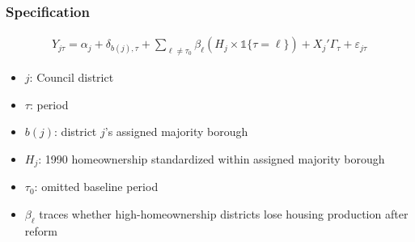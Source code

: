 \begin{frame}
    \frametitle{Specification}

    \begin{align*}
        Y_{j\tau}
        =
        \alpha_j
        +
        \delta_{b(j),\tau}
        +
        \sum_{\ell \neq \tau_0}
        \beta_\ell
        \left(H_j \times \mathds{1}\{\tau=\ell\}\right)
        +
        X_j'\Gamma_\tau
        +
        \varepsilon_{j\tau}
    \end{align*}

    \vspace{0.5em}
    \begin{itemize}
        \item \(j\): Council district
        \item \(\tau\): period
        \item \(b(j)\): district \(j\)'s assigned majority borough
        \item \(H_j\): 1990 homeownership standardized within assigned majority borough
        \item \(\tau_0\): omitted baseline period
        \item \(\beta_\ell\) traces whether high-homeownership districts lose housing production after reform
    \end{itemize}
\end{frame}
